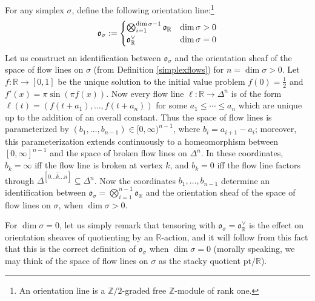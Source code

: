 \documentclass[12pt]{article}
\theoremstyle{definition}
\theoremstyle{remark}
\numberwithin{equation}{subsection}
\newcommand{\oo}{\mathfrak o}
\newcommand{\ZZ}{\mathbb Z}
\newcommand{\RR}{\mathbb R}
\newcommand{\pt}{\mathrm{pt}}
\begin{document}
For any simplex $\sigma$, define the following orientation line:\footnote{An orientation line is a $\ZZ/2$-graded free $\ZZ$-module of rank one.}
\begin{equation}
\oo_\sigma:=\begin{cases}\bigotimes_{i=1}^{\dim\sigma-1}\oo_\RR&\dim\sigma>0\cr\oo_\RR^\vee&\dim\sigma=0\end{cases}
\end{equation}
Let us construct an identification between $\oo_\sigma$ and the orientation sheaf of the space of flow lines on $\sigma$ (from Definition \ref{simplexflows}) for $n=\dim\sigma>0$.  Let $f:\RR\to[0,1]$ be the unique solution to the initial value problem $f(0)=\frac 12$ and $f'(x)=\pi\sin(\pi f(x))$.  Now every flow line $\ell:\RR\to\Delta^n$ is of the form $\ell(t)=(f(t+a_1),\ldots,f(t+a_n))$ for some $a_1\leq\cdots\leq a_n$ which are unique up to the addition of an overall constant.  Thus the space of flow lines is parameterized by $(b_1,\ldots,b_{n-1})\in[0,\infty)^{n-1}$, where $b_i=a_{i+1}-a_i$; moreover, this parameterization extends continuously to a homeomorphism between $[0,\infty]^{n-1}$ and the space of broken flow lines on $\Delta^n$.  In these coordinates, $b_k=\infty$ iff the flow line is broken at vertex $k$, and $b_k=0$ iff the flow line factors through $\Delta^{[0\ldots\hat k\ldots n]}\subseteq\Delta^n$.  Now the coordinates $b_1,\ldots,b_{n-1}$ determine an identification between $\oo_\sigma=\bigotimes_{i=1}^{n-1}\oo_\RR$ and the orientation sheaf of the space of flow lines on $\sigma$, when $\dim\sigma>0$.

For $\dim\sigma=0$, let us simply remark that tensoring with $\oo_\sigma=\oo_\RR^\vee$ is the effect on orientation sheaves of quotienting by an $\RR$-action, and it will follow from this fact that this is the correct definition of $\oo_\sigma$ when $\dim\sigma=0$ (morally speaking, we may think of the space of flow lines on $\sigma$ as the stacky quotient $\pt/\RR$).
\end{document}
